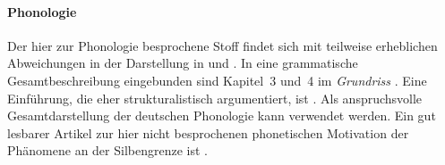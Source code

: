 \paragraph*{Phonologie}

\label{abs:pholliteratur}

Der hier zur Phonologie besprochene Stoff findet sich mit teilweise erheblichen Abweichungen in der Darstellung \zB in \citet{Hall00} und \citet{Wiese10}.
In eine grammatische Gesamtbeschreibung eingebunden sind Kapitel~3 und~4 im \textit{Grundriss} \citep{Eisenberg1}.
Eine Einführung, die eher strukturalistisch argumentiert, ist \citet{Ternes2012}.
Als anspruchsvolle Gesamtdarstellung der deutschen Phonologie kann \citet{Wiese00} verwendet werden.
Ein gut lesbarer Artikel zur hier nicht besprochenen phonetischen Motivation der Phänomene an der Silbengrenze ist \citet{Maas2002}. 
